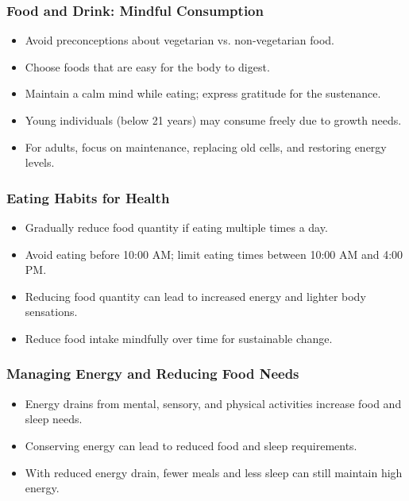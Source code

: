 \begin{frame}[fragile]\frametitle{Food and Drink: Mindful Consumption}
    \begin{itemize}
        \item Avoid preconceptions about vegetarian vs. non-vegetarian food.
        \item Choose foods that are easy for the body to digest.
        \item Maintain a calm mind while eating; express gratitude for the sustenance.
        \item Young individuals (below 21 years) may consume freely due to growth needs.
        \item For adults, focus on maintenance, replacing old cells, and restoring energy levels.
    \end{itemize}
\end{frame}

\begin{frame}[fragile]\frametitle{Eating Habits for Health}
    \begin{itemize}
        \item Gradually reduce food quantity if eating multiple times a day.
        \item Avoid eating before 10:00 AM; limit eating times between 10:00 AM and 4:00 PM.
        \item Reducing food quantity can lead to increased energy and lighter body sensations.
        \item Reduce food intake mindfully over time for sustainable change.
    \end{itemize}
\end{frame}

\begin{frame}[fragile]\frametitle{Managing Energy and Reducing Food Needs}
    \begin{itemize}
        \item Energy drains from mental, sensory, and physical activities increase food and sleep needs.
        \item Conserving energy can lead to reduced food and sleep requirements.
        \item With reduced energy drain, fewer meals and less sleep can still maintain high energy.
    \end{itemize}
\end{frame}

